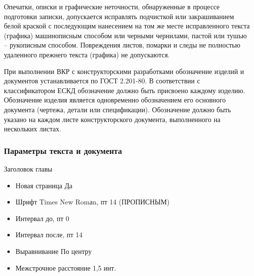     Опечатки, описки и графические неточности, обнаруженные в процессе подготовки
    записки, допускается исправлять подчисткой или закрашиванием белой краской с
    последующим нанесением на том же месте исправленного текста (графика) машинописным
    способом или черными чернилами, пастой или тушью – рукописным способом.
    Повреждения листов, помарки и следы не полностью удаленного прежнего текста (графика)
    не допускаются.

    При выполнении ВКР с конструкторскими разработками обозначение изделий и
    документов устанавливается по ГОСТ 2.201-80. В соответствии с классификатором ЕСКД
    обозначение должно быть присвоено каждому изделию. Обозначение изделия является
    одновременно обозначением его основного документа (чертежа, детали или спецификации). 
    Обозначение должно быть указано на каждом листе конструкторского документа,
    выполненного на нескольких листах.

    \subsubsection{Параметры текста и документа}
    Заголовок главы
    \begin{itemize}
        \item Новая страница Да
        \item Шрифт Times New Romаn, пт 14        (ПРОПИСНЫМ)
        \item Интервал до, пт 0
        \item Интервал после, пт 14
        \item Выравнивание По центру
        \item Межстрочное расстояние 1,5 инт.
        
    \end{itemize}

    
    
    
    
    
    
    



\clearpage
